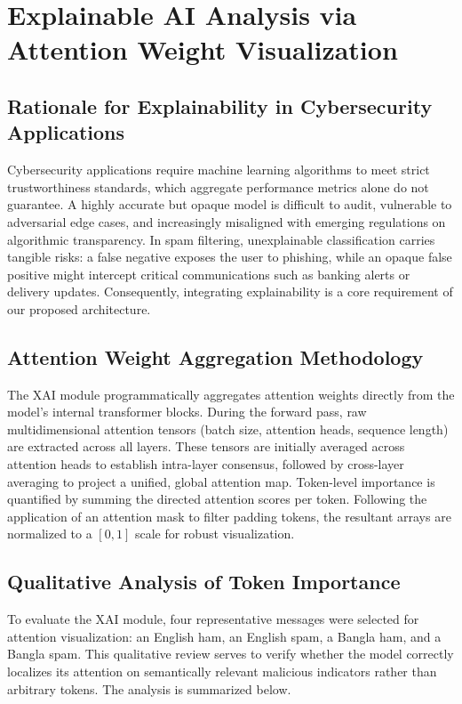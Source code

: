 \documentclass[journal]{IEEEtran}
\begin{document}
\section{Explainable AI Analysis via Attention Weight Visualization}

\subsection{Rationale for Explainability in Cybersecurity Applications}

Cybersecurity applications require machine learning algorithms to meet strict trustworthiness standards, which aggregate performance metrics alone do not guarantee. A highly accurate but opaque model is difficult to audit, vulnerable to adversarial edge cases, and increasingly misaligned with emerging regulations on algorithmic transparency. In spam filtering, unexplainable classification carries tangible risks: a false negative exposes the user to phishing, while an opaque false positive might intercept critical communications such as banking alerts or delivery updates. Consequently, integrating explainability is a core requirement of our proposed architecture.

\subsection{Attention Weight Aggregation Methodology}

The XAI module programmatically aggregates attention weights directly from the model's internal transformer blocks. During the forward pass, raw multidimensional attention tensors (batch size, attention heads, sequence length) are extracted across all layers. These tensors are initially averaged across attention heads to establish intra-layer consensus, followed by cross-layer averaging to project a unified, global attention map. Token-level importance is quantified by summing the directed attention scores per token. Following the application of an attention mask to filter padding tokens, the resultant arrays are normalized to a $[0, 1]$ scale for robust visualization.

\subsection{Qualitative Analysis of Token Importance}

To evaluate the XAI module, four representative messages were selected for attention visualization: an English ham, an English spam, a Bangla ham, and a Bangla spam. This qualitative review serves to verify whether the model correctly localizes its attention on semantically relevant malicious indicators rather than arbitrary tokens. The analysis is summarized below.
\end{document}
